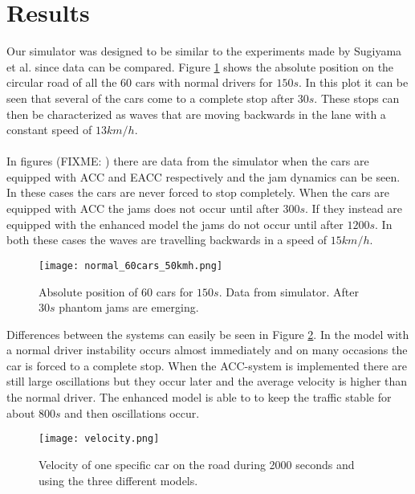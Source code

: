 \section{Results}
Our simulator was designed to be similar to the experiments made by Sugiyama
et al.\cite{sugiyama} since data can be compared. Figure \ref{normal_postime} shows the absolute position on the circular road of all the 60 cars with normal
drivers for $ 150 \unit{s} $. In this plot it can be seen that several of the
cars come to a complete stop after $ 30 \unit{s} $. These stops can then be
characterized as waves \cite{mit} that are moving backwards in the lane with
a constant speed of $ 13 \unit{km/h} $.\\\\

In figures (FIXME: ) there are data from the simulator when the cars are
equipped with ACC and EACC respectively and the jam dynamics can be seen. In
these cases the cars are never forced to stop completely. When the cars
are equipped with ACC the jams does not occur until after $ 300 \unit{s}
$. If they instead are equipped with the enhanced model the jams do not occur
until after $ 1200 \unit{s} $. In both these cases the waves are travelling
backwards in a speed of $ 15 \unit{km/h} $.


\begin{figure}[h!]
    \begin{center}
    \texttt{[image: normal\_60cars\_50kmh.png]}
    \caption{\label{normal_postime}
Absolute position of 60 cars for $ 150 \unit{s} $. Data from simulator. After $ 30 \unit{s} $ phantom jams are emerging.}
    \end{center}
\end{figure}

Differences between the systems can easily be seen in Figure \ref{velocity}. In the model with a normal driver instability occurs almost immediately and on many occasions the car is forced to a complete stop. When the ACC-system is implemented there are still large oscillations but they occur later and the average velocity is higher than the normal driver. The enhanced model is able to to keep the traffic stable for about $ 800 \unit{s} $ and then oscillations occur.

\begin{figure}[h!]
    \begin{center}
    \texttt{[image: velocity.png]}
    \caption{\label{velocity}Velocity of one specific car on the road during 2000 seconds and using the three different models.}
    \end{center}
\end{figure}

